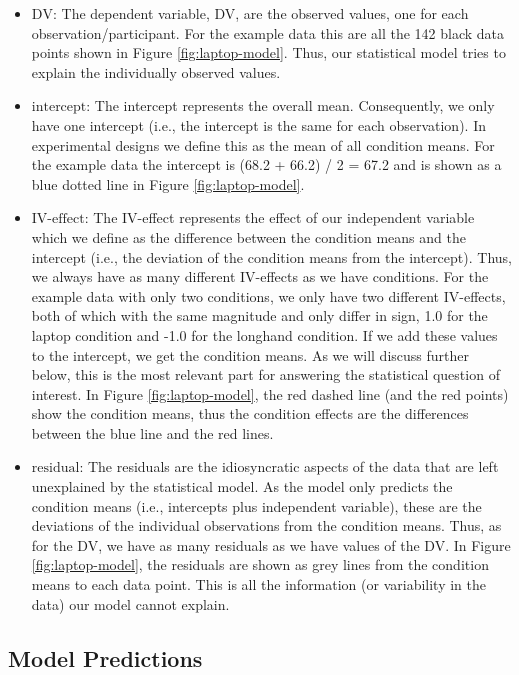\documentclass[
]{book}
\begin{document}
\begin{itemize}
\item
  \(\text{DV}\): The dependent variable, DV, are the observed values, one for each observation/participant. For the example data this are all the 142 black data points shown in Figure \ref{fig:laptop-model}. Thus, our statistical model tries to explain the individually observed values.
\item
  \(\text{intercept}\): The intercept represents the overall mean. Consequently, we only have one intercept (i.e., the intercept is the same for each observation). In experimental designs we define this as the mean of all condition means. For the example data the intercept is (68.2 + 66.2) / 2 = 67.2 and is shown as a blue dotted line in Figure \ref{fig:laptop-model}.
\item
  \(\text{IV-effect}\): The IV-effect represents the effect of our independent variable which we define as the difference between the condition means and the intercept (i.e., the deviation of the condition means from the intercept). Thus, we always have as many different IV-effects as we have conditions. For the example data with only two conditions, we only have two different IV-effects, both of which with the same magnitude and only differ in sign, 1.0 for the laptop condition and -1.0 for the longhand condition. If we add these values to the intercept, we get the condition means. As we will discuss further below, this is the most relevant part for answering the statistical question of interest. In Figure \ref{fig:laptop-model}, the red dashed line (and the red points) show the condition means, thus the condition effects are the differences between the blue line and the red lines.
\item
  \(\text{residual}\): The residuals are the idiosyncratic aspects of the data that are left unexplained by the statistical model. As the model only predicts the condition means (i.e., intercepts plus independent variable), these are the deviations of the individual observations from the condition means. Thus, as for the DV, we have as many residuals as we have values of the DV. In Figure \ref{fig:laptop-model}, the residuals are shown as grey lines from the condition means to each data point. This is all the information (or variability in the data) our model cannot explain.
\end{itemize}

\hypertarget{model-predictions}{%
\subsection{Model Predictions}\label{model-predictions}}
\end{document}
